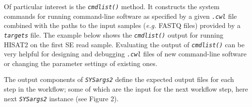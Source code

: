 \documentclass[14pt,]{article}
\newcommand{\hlnum}[1]{\textcolor[rgb]{0.816,0.125,0.439}{#1}}%
\newcommand{\hlcom}[1]{\textcolor[rgb]{0.502,0.502,0.502}{\textit{#1}}}%
\newcommand{\hlstd}[1]{\textcolor[rgb]{0.251,0.251,0.251}{#1}}%
\newenvironment{Shaded}{\begin{myshaded}}{\end{myshaded}}
\newcommand{\DecValTok}[1]{\hlnum{#1}}
\newcommand{\DocumentationTok}[1]{\hlcom{#1}}
\newcommand{\FunctionTok}[1]{\hlstd{#1}}
\newcommand{\NormalTok}[1]{\hlstd{#1}}
\begin{document}
Of particular interest is the \emph{\texttt{cmdlist()}} method. It constructs the system
commands for running command-line software as specified by a given \emph{\texttt{.cwl}}
file combined with the paths to the input samples (\emph{e.g.} FASTQ files) provided
by a \emph{\texttt{targets}} file. The example below shows the \emph{\texttt{cmdlist()}} output for
running HISAT2 on the first SE read sample. Evaluating the output of
\emph{\texttt{cmdlist()}} can be very helpful for designing and debugging \emph{\texttt{.cwl}} files
of new command-line software or changing the parameter settings of existing
ones.

\begin{Shaded}
\end{Shaded}

The output components of \emph{\texttt{SYSargs2}} define the expected output files for
each step in the workflow; some of which are the input for the next workflow step,
here next \emph{\texttt{SYSargs2}} instance (see Figure 2).
\end{document}
